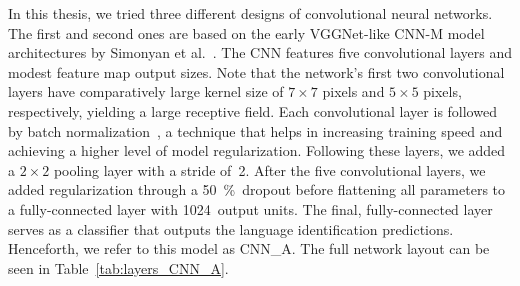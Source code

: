 In this thesis, we tried three different designs of convolutional neural networks. The first and second ones are based on the early VGGNet-like CNN-M model architectures by Simonyan et al.~\cite{Chatfield14}. The CNN features five convolutional layers and modest feature map output sizes. Note that the network's first two convolutional layers have comparatively large kernel size of $7 \times 7$ pixels and $5 \times 5$ pixels, respectively, yielding a large receptive field. Each convolutional layer is followed by batch normalization~\cite{ioffe2015batch}, a technique that helps in increasing training speed and achieving a higher level of model regularization. Following these layers, we added a $2 \times 2$ pooling layer with a stride of~\num{2}. After the five convolutional layers, we added regularization through a \SI{50}{\percent}~dropout before flattening all parameters to a fully-connected layer with \num{1024}~output units. The final, fully-connected layer serves as a classifier that outputs the language identification predictions. Henceforth, we refer to this model as CNN\_A. The full network layout can be seen in Table~\ref{tab:layers_CNN_A}.
%
